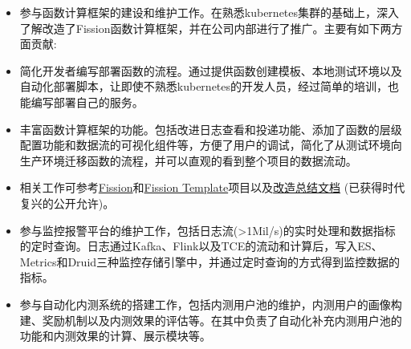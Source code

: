 \documentclass{resume}
\begin{document}
  \begin{itemize}[topsep = 0 pt, partopsep = 0pt]
    \item 参与函数计算框架的建设和维护工作。在熟悉kubernetes集群的基础上，深入了解改造了Fission函数计算框架，并在公司内部进行了推广。主要有如下两方面贡献:
    \item 简化开发者编写部署函数的流程。通过提供函数创建模板、本地测试环境以及自动化部署脚本，让即使不熟悉kubernetes的开发人员，经过简单的培训，也能编写部署自己的服务。
    \item 丰富函数计算框架的功能。包括改进日志查看和投递功能、添加了函数的层级配置功能和数据流的可视化组件等，方便了用户的调试，简化了从测试环境向生产环境迁移函数的流程，并可以直观的看到整个项目的数据流动。
    \item 相关工作可参考\href{https://github.com/jingtaozhang18/fission}{Fission}和\href{https://github.com/jingtaozhang18/fission-template}{Fission Template}项目以及\href{https://jingtao.fun/%E6%BA%90%E7%A0%81-Fission%E5%8A%9F%E8%83%BD%E6%8B%93%E5%B1%95/}{改造总结文档} (已获得时代复兴的公开允许)。
  \end{itemize}
  
  \begin{itemize}[topsep = 0 pt, partopsep = 0pt]
    \item 参与监控报警平台的维护工作，包括日志流(>1Mil/s)的实时处理和数据指标的定时查询。日志通过Kafka、Flink以及TCE的流动和计算后，写入ES、Metrics和Druid三种监控存储引擎中，并通过定时查询的方式得到监控数据的指标。
    \item 参与自动化内测系统的搭建工作，包括内测用户池的维护，内测用户的画像构建、奖励机制以及内测效果的评估等。在其中负责了自动化补充内测用户池的功能和内测效果的计算、展示模块等。
  \end{itemize}
  
\end{document}
